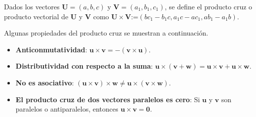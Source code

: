 \begin{definition}
Dados los vectores $\mathbf{U} = (a, b, c)$ y $\mathbf{V} = (a_1, b_1, c_1)$, se define el producto cruz o producto vectorial de $\mathbf{U}$ y $\mathbf{V}$ como $\mathbf{U} \times \mathbf{V}$:=$(bc_1 - b_1 c, a_1 c - a c_1, ab_1 - a_1 b)$.    
\end{definition}

Algunas propiedades del producto cruz se muestran a continuación.
\begin{itemize}
   
\item \textbf{Anticonmutatividad}: $\mathbf{u} \times \mathbf{v} =-(\mathbf{v} \times \mathbf{u})$.

\item \textbf{Distributividad con respecto a la suma}: $\mathbf{u} \times (\mathbf{v} + \mathbf{w}) = \mathbf{u} \times \mathbf{v} + \mathbf{u} \times \mathbf{w}$.

\item \textbf{No es asociativo}: $(\mathbf{u} \times \mathbf{v}) \times \mathbf{w} \neq \mathbf{u} \times (\mathbf{v} \times \mathbf{w})$.

\item \textbf{El producto cruz de dos vectores paralelos es cero}: Si $\mathbf{u}$ y $\mathbf{v}$ son paralelos o antiparalelos, entonces $\mathbf{u} \times \mathbf{v} = \mathbf{0}$.

\end{itemize}
